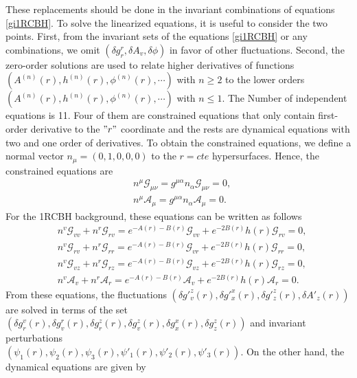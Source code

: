 \documentclass[preprintnumbers,aps,prd,longbibliography,nofootinbib,nobibnotes,amsmath,amssymb]{revtex4}
\begin{document}
These replacements should be done in the invariant combinations of equations \eqref{gi1RCBH}. To solve the linearized equations, it is useful to consider  the two points. First, from the invariant sets of the equations \eqref{gi1RCBH} or any combinations, we omit $(\delta g^r_r, \delta A_v, \delta \phi)$ in favor of other fluctuations. Second, the zero-order solutions are used to relate higher derivatives of functions $(A^{(n)}(r), h^{(n)}(r), \phi^{(n)}(r), \cdots)$ with $n \geq 2$ to the lower orders $(A^{(n)}(r), h^{(n)}(r), \phi^{(n)}(r), \cdots)$ with $n \leq 1$. The Number of independent equations is 11. Four of them are constrained equations that only contain first-order derivative to the $"r"$ coordinate and the rests are dynamical equations with two and one order of derivatives. To obtain the constrained equations, we define a normal vector $n_\mu = (0, 1, 0, 0, 0)$ to the $r= cte$ hypersurfaces. 
 Hence, the constrained equations are
\begin{align}
	&n^\mu \mathcal{G}_{\mu \nu} = g^{\mu \alpha} n_\alpha \mathcal{G}_{\mu \nu} = 0, \nonumber\\
	& n^\mu \mathcal{A}_{\mu} = g^{\mu \alpha} n_\alpha \mathcal{A}_{\mu} = 0.
\end{align}   
For the 1RCBH background, these equations can be written as follows
\begin{align}\label{eq1d}
	&n^v \mathcal{G}_{v v}  + n^r \mathcal{G}_{r v} =  e^{- A(r) - B(r)} \mathcal{G}_{v v} + e^{- 2 B(r)} h(r) \mathcal{G}_{r v}= 0, \nonumber\\
	&n^v \mathcal{G}_{r v}  + n^r \mathcal{G}_{r r} =  e^{- A(r) - B(r)} \mathcal{G}_{v r} + e^{- 2 B(r)} h(r) \mathcal{G}_{r r}= 0, \nonumber\\
	& n^v \mathcal{G}_{v z}  + n^r \mathcal{G}_{r z} =  e^{- A(r) - B(r)} \mathcal{G}_{v z} + e^{- 2 B(r)} h(r) \mathcal{G}_{r z}= 0, \nonumber\\
	&n^v \mathcal{A}_{v}  + n^r \mathcal{A}_{r} =  e^{- A(r) - B(r)} \mathcal{A}_{v} + e^{- 2 B(r)} h(r) \mathcal{A}_{r}= 0.
\end{align}
From these equations, the fluctuations $\left(\delta g'^{z}_v(r), \delta g'^{x}_x(r), \delta g'^z_z(r), \delta A'_z(r)\right)$ are solved in terms of the set 
$\left(\delta g^v_r(r), \delta g^r_v(r), \delta g^z_r(r), \delta g^z_v(r), \delta g^x_x(r), \delta g^z_z(r) \right)$ and invariant perturbations\\
 $\left(\psi_1(r), \psi_2(r), \psi_3(r), \psi'_1(r), \psi'_2(r), \psi'_3(r)\right)$. On the other hand, the dynamical equations are given by
\end{document}
